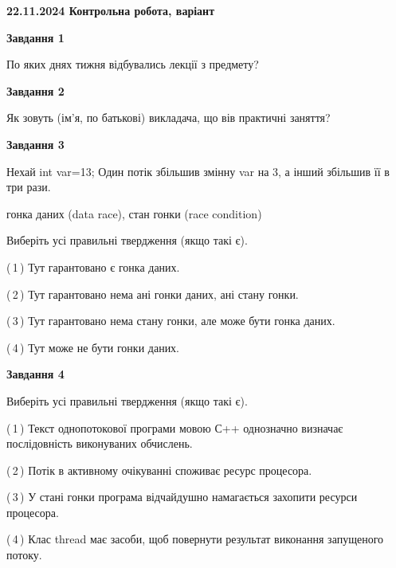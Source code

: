 \documentclass[12pt, ukrainian]{article}
\begin{document}
\begin {large}

\textbf{22.11.2024 Контрольна робота, варіант  }\par


{

\begin{center}
\textbf{Завдання 1}
\end{center}

По яких днях тижня відбувались лекції з предмету?


\begin{center}
\textbf{Завдання 2}
\end{center}

Як зовуть (ім'я, по батькові) викладача, що вів практичні заняття?


\begin{center}
\textbf{Завдання 3}
\end{center}

Нехай int var=13; Один потік збільшив змінну var на 3, а інший збільшив її в три рази.

гонка даних (data race), стан гонки (race condition)

Виберіть усі правильні твердження (якщо такі є).\par
\vspace{2mm}
(\,1\,) Тут гарантовано є гонка даних.%

(\,2\,) Тут гарантовано нема ані гонки даних, ані стану гонки.%

(\,3\,) Тут гарантовано нема стану гонки, але може бути гонка даних.%

(\,4\,) Тут може не бути гонки даних.%


\begin{center}
\textbf{Завдання 4}
\end{center}

Виберіть усі правильні твердження (якщо такі є).\par
\vspace{2mm}

(\,1\,) Текст однопотокової програми мовою С++ однозначно визначає послідовність виконуваних обчислень.%

(\,2\,) Потік в активному очікуванні споживає ресурс процесора.%

(\,3\,) У стані гонки програма відчайдушно намагається захопити ресурси процесора.%

(\,4\,) Клас thread має засоби, щоб повернути результат виконання запущеного потоку.%


}
\end{large}
\end{document}
